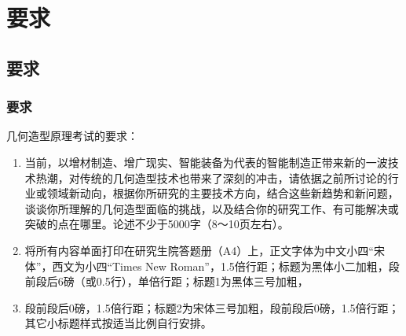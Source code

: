 \section{要求}

\subsection{要求}

\subsubsection{要求}

几何造型原理考试的要求：

\begin{enumerate}
	\item 当前，以增材制造、增广现实、智能装备为代表的智能制造正带来新的一波技术热潮，对传统的几何造型技术也带来了深刻的冲击，请依据之前所讨论的行业或领域新动向，根据你所研究的主要技术方向，结合这些新趋势和新问题，谈谈你所理解的几何造型面临的挑战，以及结合你的研究工作、有可能解决或突破的点在哪里。论述不少于5000字（8～10页左右）。
	
	\item 将所有内容单面打印在研究生院答题册（A4）上，正文字体为中文小四“宋体”，西文为小四“Times New Roman”，1.5倍行距；标题为黑体小二加粗，段前段后6磅（或0.5行），单倍行距；标题1为黑体三号加粗，
	
	\item 段前段后0磅，1.5倍行距；标题2为宋体三号加粗，段前段后0磅，1.5倍行距；其它小标题样式按适当比例自行安排。
\end{enumerate}

